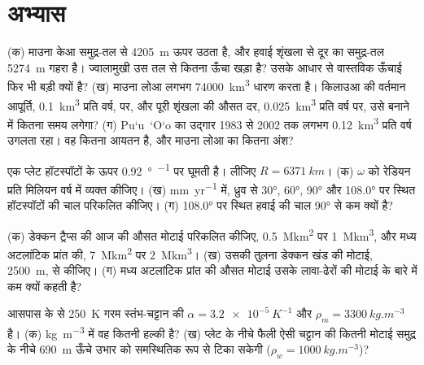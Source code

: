 \section{अभ्यास}

\begin{exercise}[$\star$]\label{exo:b1:hotspots:1}
(क) माउना केआ समुद्र-तल से \qty{4205}{m} ऊपर उठता है, और हवाई शृंखला से दूर का समुद्र-तल \qty{5274}{m} गहरा है। ज्वालामुखी उस तल से कितना ऊँचा खड़ा है? उसके आधार से वास्तविक ऊँचाई फिर भी बड़ी क्यों है? (ख) माउना लोआ लगभग \qty{74000}{km^3} धारण करता है। किलाउआ की वर्तमान आपूर्ति, \qty{0.1}{km^3} प्रति वर्ष, पर, और पूरी शृंखला की औसत दर, \qty{0.025}{km^3} प्रति वर्ष पर, उसे बनाने में कितना समय लगेगा? (ग) Pu\textquoteleft u~\textquoteleft O\textquoteleft o का उद्गार 1983 से 2002 तक लगभग \qty{0.12}{km^3} प्रति वर्ष उगलता रहा। वह कितना आयतन है, और माउना लोआ का कितना अंश?
\end{exercise}

\begin{exercise}[$\star$]\label{exo:b1:hotspots:2}
एक प्लेट हॉटस्पॉटों के ऊपर \qty{0.92}{\degree\per\Myr} पर घूमती है। लीजिए $R = \qty{6371}{km}$। (क) $\omega$ को रेडियन प्रति मिलियन वर्ष में व्यक्त कीजिए। (ख) \unit{mm.yr^{-1}} में, ध्रुव से \ang{30}, \ang{60}, \ang{90} और \ang{108.0} पर स्थित हॉटस्पॉटों की चाल परिकलित कीजिए। (ग) \ang{108.0} पर स्थित हवाई की चाल \ang{90} से कम क्यों है?
\end{exercise}

\begin{exercise}[$\star$]\label{exo:b1:hotspots:3}
(क) डेक्कन ट्रैप्स की आज की औसत मोटाई परिकलित कीजिए, \qty{0.5}{\mega km^2} पर \qty{1}{\mega km^3}, और मध्य अटलांटिक प्रांत की, \qty{7}{\mega km^2} पर \qty{2}{\mega km^3}। (ख) उसकी तुलना डेक्कन खंड की मोटाई, \qty{2500}{m}, से कीजिए। (ग) मध्य अटलांटिक प्रांत की औसत मोटाई उसके लावा-ढेरों की मोटाई के बारे में कम क्यों कहती है?
\end{exercise}

\begin{exercise}[$\star$]\label{exo:b1:hotspots:4}
आसपास के  से \qty{250}{K} गरम स्तंभ-चट्टान की $\alpha = \qty{3.2e-5}{K^{-1}}$ और $\rho_m = \qty{3300}{kg.m^{-3}}$ है। (क) \unit{kg.m^{-3}} में वह कितनी हल्की है? (ख) प्लेट के नीचे फैली ऐसी चट्टान की कितनी मोटाई समुद्र के नीचे \qty{690}{m} ऊँचे उभार को समस्थितिक रूप से टिका सकेगी ($\rho_w = \qty{1000}{kg.m^{-3}}$)?
\end{exercise}

